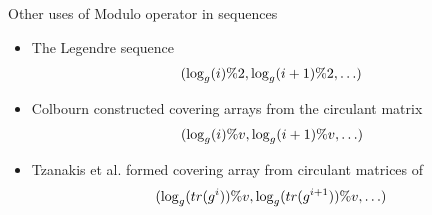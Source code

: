   \begin{frame}{Other uses of Modulo operator in sequences}

    \begin{itemize}
      \item The Legendre sequence
      \[
(\log_g(i) \% 2, \log_g(i+1) \% 2, \ldots )      
        \]
      \item  Colbourn constructed covering arrays from the circulant matrix
      \[
(\log_g(i) \% v, \log_g(i+1) \% v, \ldots )      
        \]
      \item Tzanakis et al. formed covering array from circulant matrices of
        \[
(\log_g( tr(g^i)) \% v, \log_g( tr(g^{i+1})) \% v, \ldots )      
        \]
      \end{itemize}
    
    \end{frame}


  

